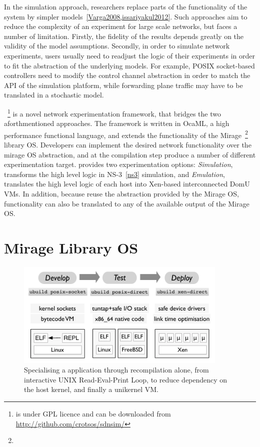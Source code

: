 In the simulation approach, researchers replace parts of the functionality of
the system by simpler models~\ref{Varga2008,issariyakul2012}.  Such
approaches aim to reduce the complexity of an experiment for large scale
networks, but faces a number of limitation.  Firstly, the fidelity of the
results depends greatly on the validity of the model assumptions. Secondly, in
order to simulate network experiments, users usually need to readjust the logic
of their experiments in order to fit the abstraction of the underlying models.
For example, POSIX socket-based controllers need to modify the control channel
abstraction in order to match the API of the simulation platform,
while forwarding plane traffic may have to be translated in a stochastic model. 

\sdnsim~\footnote{\sdnsim is under GPL licence and can be downloaded from
  \url{http://github.com/crotsos/sdnsim/}} is a novel network experimentation
framework, that bridges the two aforthmentioned approaches. The framework is
written in OcaML, a high performance functional language, and extends the
functionality of the Mirage~\footnote{\mirageurl} library OS. Developers can
implement the desired network functionality over the mirage OS abstraction, and
at the compilation step produce a number of different experimentation target.
\sdnsim provides two experimentation options: \emph{Simulation}, transforms
the high level logic in NS-3~\ref{ns3} simulation, and \emph{Emulation},
translates the high level logic of each host into Xen-based interconnected DomU
VMs. In addition, because \sdnsim reuse the abstraction provided by the Mirage
OS, functionality can also be translated to any of the available output of
the Mirage OS.

\section{Mirage Library OS} \label{sec:mirage-intro}

\begin{figure}
\includegraphics[width=0.9\textwidth]{mirage-toolchain}
\caption{Specialising a \mirage application through recompilation alone, from
  interactive UNIX Read-Eval-Print Loop, to reduce dependency on the host
  kernel, and finally a unikernel VM.}
\label{fig:mirage-toolchain}
\end{figure}

